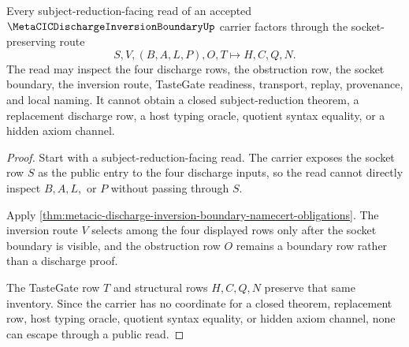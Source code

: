 \begin{theorem}
\label{thm:metacic-discharge-inversion-boundary-socket-nonescape}
Every subject-reduction-facing read of an accepted $\MetaCICDischargeInversionBoundaryUp$ carrier factors through the socket-preserving route
$$
S,V,(B,A,L,P),O,T \longmapsto H,C,Q,N .
$$
The read may inspect the four discharge rows, the obstruction row, the socket boundary, the inversion route, TasteGate readiness, transport, replay, provenance, and local naming. It cannot obtain a closed subject-reduction theorem, a replacement discharge row, a host typing oracle, quotient syntax equality, or a hidden axiom channel.
\end{theorem}
\begin{proof}
Start with a subject-reduction-facing read. The carrier exposes the socket row $S$ as the public entry to the four discharge inputs, so the read cannot directly inspect $B,A,L,$ or $P$ without passing through $S$.

Apply \autoref{thm:metacic-discharge-inversion-boundary-namecert-obligations}. The inversion route $V$ selects among the four displayed rows only after the socket boundary is visible, and the obstruction row $O$ remains a boundary row rather than a discharge proof.

The TasteGate row $T$ and structural rows $H,C,Q,N$ preserve that same inventory. Since the carrier has no coordinate for a closed theorem, replacement row, host typing oracle, quotient syntax equality, or hidden axiom channel, none can escape through a public read.
\end{proof}


\begin{closurestatus}{\MetaCICDischargeInversionBoundaryUp}
  \theoryclosure{\seedClosure}
  \formalstatus{\unformalizedV}
\end{closurestatus}
